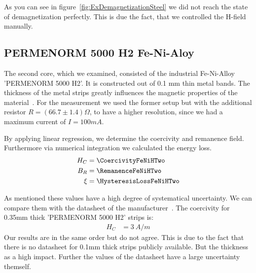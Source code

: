 \documentclass[a4paper,10pt,twocolumn]{article}
\begin{document}
    As you can see in figure~\ref{fig:ExDemagnetizationSteel} we did not reach the state of demagnetization perfectly.
    This is due the fact, that we controlled the H-field manually.
    
    \subsection{PERMENORM 5000 H2 Fe-Ni-Aloy}
    
    
    The second core, which we examined, consisted of the industrial Fe-Ni-Alloy 'PERMENORM 5000 H2'.
    It is constructed out of 0.1 mm thin metal bands.
    The thickness of the metal strips greatly influences the magnetic properties of the material~\cite{feniDatasheet}.
    For the measurement we used the former setup but with the additional resistor $R = (66.7 \pm 1.4) \Omega$,
    to have a higher resolution, since we had a maximum current of $I = 100mA$.
    
    By applying linear regression, we determine the coercivity and remanence field.
    Furthermore via numerical integration we calculated the energy loss.
    \begin{align*}
        H_C &= \CoercivityFeNiHTwo \\
        B_R &= \RemanenceFeNiHTwo \\
        \xi &= \HysteresisLossFeNiHTwo
    \end{align*}
    
    As mentioned these values have a high degree of systematical uncertainty.
    We can compare them with the datasheet of the manufacturer~\cite{feniDatasheet}.
    The coercivity for 0.35mm thick 'PERMENORM 5000 H2' strips is:
    \begin{align*}
        H_C &= 3 \ A/m
    \end{align*}
    Our results are in the same order but do not agree.
    This is due to the fact that there is no datasheet for 0.1mm thick strips publicly available.
    But the thickness as a high impact.
    Further the values of the datasheet have a large uncertainty themself.
    
\end{document}

